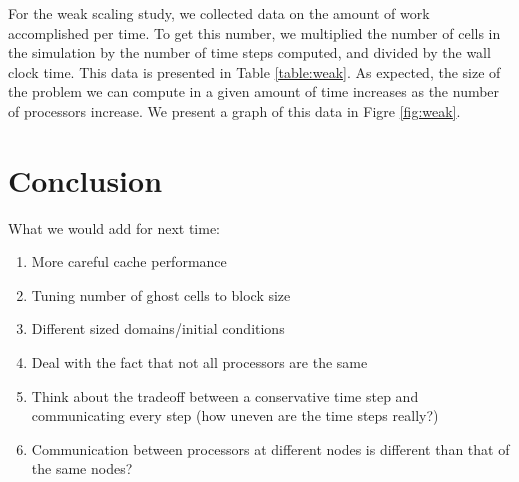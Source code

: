 \documentclass{article}
\begin{document}
For the weak scaling study, we collected data on the amount of work
accomplished per time. To get this number, we multiplied the number of
cells in the simulation by the number of time steps computed, and divided
by the wall clock time. This data is presented in Table \ref{table:weak}.
As expected, the size of the problem we can compute in a given amount of
time increases as the number of processors increase. We present a graph of
this data in Figre \ref{fig:weak}.


\section{Conclusion}
What we would add for next time:
\begin{enumerate}
	\item More careful cache performance
	\item Tuning number of ghost cells to block size
	\item Different sized domains/initial conditions
	\item Deal with the fact that not all processors are the same
	\item Think about the tradeoff between a conservative time step and communicating every step (how uneven are the time steps really?)
	\item Communication between processors at different nodes is different than that of the same nodes?
\end{enumerate}
\end{document}
